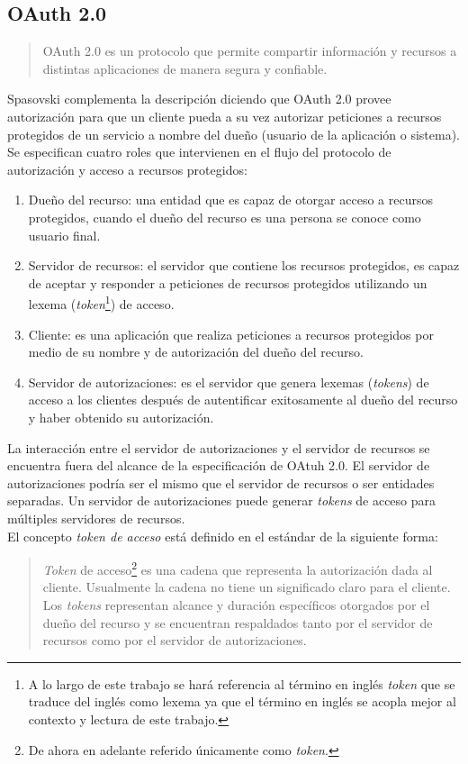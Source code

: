 \subsection{OAuth 2.0}\label{sec:oauth}
\begin{quote}
	OAuth 2.0 es un protocolo que permite compartir información y recursos a distintas aplicaciones de manera segura y confiable\cite{MasteringOAuth2}.
\end{quote}
Spasovski complementa la descripción diciendo que OAuth 2.0 provee autorización para que un cliente pueda a su vez autorizar peticiones a recursos protegidos de un servicio a nombre del dueño (usuario de la aplicación o sistema)\cite{OAuth2Identity}.
Se especifican cuatro roles que intervienen en el flujo del protocolo de autorización y acceso a recursos protegidos\cite{OAuthRFC}:
\begin{enumerate}
	\item Dueño del recurso: una entidad que es capaz de otorgar acceso a recursos protegidos, cuando el dueño del recurso es una persona se conoce como usuario final.
	\item Servidor de recursos: el servidor que contiene los recursos protegidos, es capaz de aceptar y responder a peticiones de recursos protegidos utilizando un lexema (\textit{token}\footnote{A lo largo de este trabajo se hará referencia al término en inglés \textit{token} que se traduce del inglés como lexema ya que el término en inglés se acopla mejor al contexto y lectura de este trabajo.}) de acceso.
	\item Cliente: es una aplicación que realiza peticiones a recursos protegidos por medio de su nombre y de autorización del dueño del recurso.
	\item Servidor de autorizaciones: es el servidor que genera lexemas (\textit{tokens}) de acceso a los clientes después de autentificar exitosamente al dueño del recurso y haber obtenido su autorización.
\end{enumerate}
La interacción entre el servidor de autorizaciones y el servidor de recursos se encuentra fuera del alcance de la especificación de OAtuh 2.0. El servidor de autorizaciones podría ser el mismo que el servidor de recursos o ser entidades separadas. Un servidor de autorizaciones puede generar \textit{tokens} de acceso para múltiples servidores de recursos\cite{OAuthRFC}.\\
El concepto \textit{token de acceso} está definido en el estándar de la siguiente forma\cite{OAuthRFC}:
\begin{quote}
	\textit{Token} de acceso\footnote{De ahora en adelante referido únicamente como \textit{token}.} es una cadena que representa la autorización dada al cliente. Usualmente la cadena no tiene un significado claro para el cliente. Los \textit{tokens} representan alcance y duración específicos otorgados por el dueño del recurso y se encuentran respaldados tanto por el servidor de recursos como por el servidor de autorizaciones.
\end{quote}

